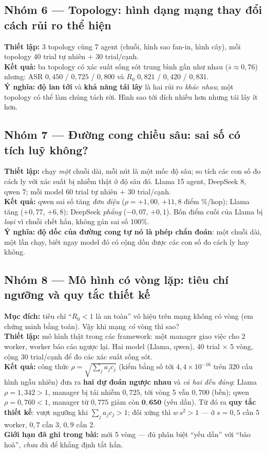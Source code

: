 \documentclass[11pt,a4paper]{article}
\newcommand{\nhan}[1]{\textbf{#1}}
\begin{document}
\subsection{Nhóm 6 --- Topology: hình dạng mạng thay đổi cách rủi ro thể hiện}
\nhan{Thiết lập:} 3 topology cùng 7 agent (chuỗi, hình sao fan-in, hình cây), mỗi topology
40 trial tự nhiên $+$ 30 trial/cạnh.\\
\nhan{Kết quả:} ba topology có xác suất sống sót trung bình gần như nhau
($\bar s \approx 0{,}76$) nhưng: ASR $0{,}450$ / $0{,}725$ / $0{,}800$ và
$R_0$ $0{,}821$ / $0{,}420$ / $0{,}831$.\\
\nhan{Ý nghĩa:} \textbf{độ lan tới} và \textbf{khả năng tái lây} là hai rủi ro \emph{khác
nhau}; một topology có thể làm chúng tách rời. Hình sao tới đích nhiều hơn nhưng tái lây
ít hơn.

\subsection{Nhóm 7 --- Đường cong chiều sâu: sai số có tích luỹ không?}
\nhan{Thiết lập:} chạy \emph{một} chuỗi dài, mỗi nút là một mốc độ sâu; so tích các con số
đo cách ly với xác suất bị nhiễm thật ở độ sâu đó. Llama 15 agent, DeepSeek 8, qwen 7;
mỗi model 60 trial tự nhiên $+$ 30 trial/cạnh.\\
\nhan{Kết quả:} qwen sai số tăng \emph{đơn điệu} ($\rho=+1{,}00$, $+11{,}8$ điểm \%/hop);
Llama tăng ($+0{,}77$, $+6{,}8$); DeepSeek \emph{phẳng} ($-0{,}07$, $+0{,}1$). Bốn điểm
cuối của Llama bị \emph{loại} vì chuỗi chết hẳn, không gán sai số 100\%.\\
\nhan{Ý nghĩa:} \textbf{độ dốc của đường cong tự nó là phép chẩn đoán}: một chuỗi dài,
một lần chạy, biết ngay model đó có cộng dồn được các con số đo cách ly hay không.

\subsection{Nhóm 8 --- Mô hình có vòng lặp: tiêu chí ngưỡng và quy tắc thiết kế}
\nhan{Mục đích:} tiêu chí ``$R_0<1$ là an toàn'' vô hiệu trên mạng không có vòng (em
chứng minh bằng toán). Vậy khi mạng \emph{có} vòng thì sao?\\
\nhan{Thiết lập:} mô hình thật trong các framework: một manager giao việc cho 2 worker,
worker báo cáo ngược lại. Hai model (Llama, qwen), 40 trial $\times$ 5 vòng, cộng 30
trial/cạnh để đo các xác suất sống sót.\\
\nhan{Kết quả:} công thức $\rho=\sqrt{\sum_j a_jc_j}$ (kiểm bằng số tới
$4{,}4\times10^{-16}$ trên 320 cấu hình ngẫu nhiên) đưa ra \textbf{hai dự đoán ngược nhau}
và \emph{cả hai đều đúng}: Llama $\rho=1{,}342>1$, manager bị tái nhiễm $0{,}725$, tới
vòng 5 vẫn $0{,}700$ (bền); qwen $\rho=0{,}760<1$, manager từ $0{,}775$ giảm còn
$\mathbf{0{,}650}$ (yếu dần). Từ đó ra \textbf{quy tắc thiết kế}: vượt ngưỡng khi
$\sum_j a_jc_j>1$; đối xứng thì $w\,s^2>1$ --- ở $s=0{,}5$ cần 5 worker, $0{,}7$ cần 3,
$0{,}9$ cần 2.\\
\nhan{Giới hạn đã ghi trong bài:} mới 5 vòng --- đủ phân biệt ``yếu dần'' với ``bão hoà'',
\emph{chưa} đủ để khẳng định tắt hẳn.
\end{document}
